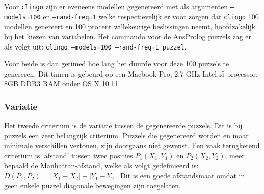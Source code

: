 \documentclass{article}
\begin{document}
Voor \texttt{clingo} zijn er eveneens modellen gegenereerd met als argumenten \texttt{--models=100} en \texttt{--rand-freq=1} welke respectievelijk er voor zorgen dat \texttt{clingo} 100 modellen genereert en 100 procent willekeurige beslissingen neemt, hoofdzakelijk bij het kiezen van variabelen. Het commando voor de AnsProlog puzzels zag er als volgt uit: \texttt{clingo --models=100 --rand-freq=1 puzzel}.

Voor beide is dan getimed hoe lang het duurde voor deze 100 puzzels te genereren. Dit timen is gebeurd op een Macbook Pro, 2.7 GHz Intel i5-processor, 8GB DDR3 RAM onder OS X 10.11.

\subsubsection{Variatie}
Het tweede criterium is de variatie tussen de gegenereerde puzzels. Dit is bij puzzels een zeer belangrijk criterium. Puzzels die gegenereerd worden en maar minimale verschillen vertonen, zijn doorgaans niet gewenst. Een vaak terugkerend criterium is `afstand' tussen twee posities $P_1(X_1, Y_1)$ en $P_2(X_2, Y_2)$, meer bepaald de Manhattan-afstand, welke als volgt gedefinieerd is:
$ D(P_1,P_2) = | X_1 - X_2 | + | Y_1 - Y_2 |$. Dit is een goede afstandsmaat omdat in geen enkele puzzel diagonale bewegingen zijn toegelaten.
\end{document}

